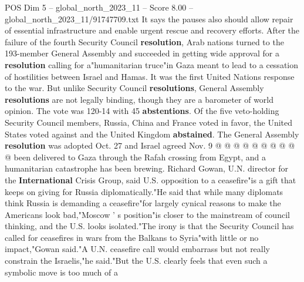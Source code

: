 \begin{textsample}{POS Dim 5 – global\_north\_2023\_11 – Score 8.00 – global\_north\_2023\_11/91747709.txt}
It says the pauses also should allow repair of essential infrastructure and enable urgent rescue and recovery efforts.
After the failure of the fourth Security Council \textbf{resolution}, Arab nations turned to the 193-member General Assembly and succeeded in getting wide approval for a \textbf{resolution} calling for a"humanitarian truce"in Gaza meant to lead to a cessation of hostilities between Israel and Hamas.
It was the first United Nations response to the war.
But unlike Security Council \textbf{resolutions}, General Assembly \textbf{resolutions} are not legally binding, though they are a barometer of world opinion.
The vote was 120-14 with 45 \textbf{abstentions}.
Of the five veto-holding Security Council members, Russia, China and France voted in favor, the United States voted against and the United Kingdom \textbf{abstained}.
The General Assembly \textbf{resolution} was adopted Oct. 27 and Israel agreed Nov. 9 @ @ @ @ @ @ @ @ @ @ been delivered to Gaza through the Rafah crossing from Egypt, and a humanitarian catastrophe has been brewing.
Richard Gowan, U.N. director for the \textbf{International} Crisis Group, said U.S. opposition to a ceasefire"is a gift that keeps on giving for Russia diplomatically."He said that while many diplomats think Russia is demanding a ceasefire"for largely cynical reasons to make the Americans look bad,"Moscow ' s position"is closer to the mainstream of council thinking, and the U.S. looks isolated."The irony is that the Security Council has called for ceasefires in wars from the Balkans to Syria"with little or no impact,"Gowan said."A U.N. ceasefire call would embarrass but not really constrain the Israelis,"he said."But the U.S. clearly feels that even such a symbolic move is too much of a

\end{textsample}

